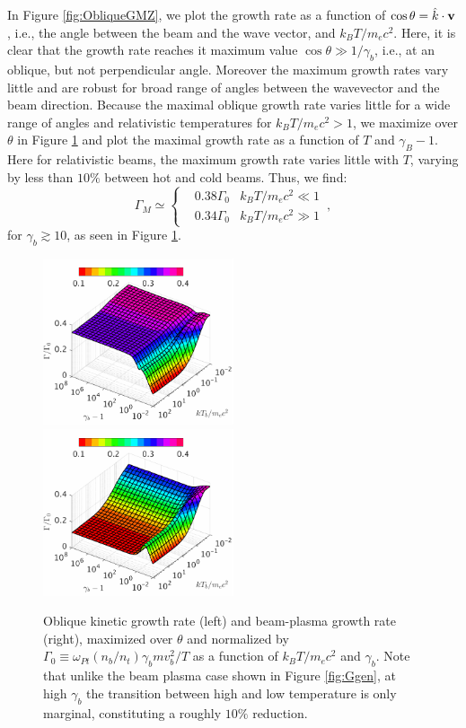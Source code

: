 \documentclass[usenatbib,iop,apj]{emulateapj}
\newcommand\bmath[1] {\mbox{\boldmath$\rm #1$}}
\newcommand{\vel}{\ensuremath{\bmath{v}}}
\begin{document}
In Figure \ref{fig:ObliqueGMZ}, we plot the growth rate as a function of $\cos\theta = \hat{k}\cdot\vel$, i.e., the angle between the beam and the wave vector, and $k_BT/m_e c^2$.  Here, it is clear that the growth rate reaches it maximum value $\cos\theta \gg 1/\gamma_b$, i.e., at an oblique, but not perpendicular angle.  Moreover the maximum growth rates vary little and are robust for broad range of angles between the wavevector and the beam direction.  Because the maximal oblique growth rate varies little for a wide range of angles and relativistic temperatures for $k_B T/m_ec^2 > 1$, we maximize over $\theta$ in Figure \ref{fig:OGgen} and plot the maximal growth rate as a function of $T$ and $\gamma_B - 1$.  Here for relativistic beams, the maximum growth rate varies little with $T$, varying by less than $10\%$ between hot and cold beams.  Thus, we find: 
\begin{equation}
\Gamma_M
\simeq
\left\{
\begin{aligned}
& 0.38 \Gamma_0 & k_BT/m_ec^2\ll 1\\
& 0.34 \Gamma_0 & k_BT/m_ec^2\gg 1
\end{aligned}
\right.\,,
\end{equation}
for $\gamma_b\gtrsim10$, as seen in Figure \ref{fig:OGgen}.  

\begin{figure}
\includegraphics[width=0.5\textwidth]{pp2.pdf}
\includegraphics[width=0.5\textwidth]{pp3.pdf}

\caption{Oblique kinetic growth rate (left) and beam-plasma growth rate (right), maximized over $\theta$ and normalized by
  $\Gamma_0\equiv\omega_{Pt}(n_b/n_t)\gamma_b m v_b^2/T$ as a function
  of $k_BT/m_ec^2$ and $\gamma_b$.  Note that unlike the beam
  plasma case shown in Figure \ref{fig:Ggen}, at high $\gamma_b$ the
  transition between high and low temperature is only marginal,
  constituting a roughly $10\%$ reduction.} \label{fig:OGgen}
\end{figure}
\end{document}
